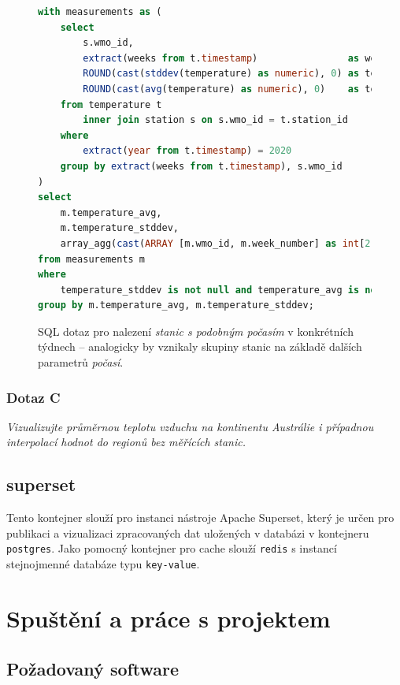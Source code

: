 \documentclass[10pt,a4paper,titlepage]{extarticle}
\begin{document}
\begin{figure}[H]
    \begin{lstlisting}[language=SQL]
with measurements as (
    select
        s.wmo_id,
        extract(weeks from t.timestamp)                as week_number,
        ROUND(cast(stddev(temperature) as numeric), 0) as temperature_stddev,
        ROUND(cast(avg(temperature) as numeric), 0)    as temperature_avg
    from temperature t
        inner join station s on s.wmo_id = t.station_id
    where
        extract(year from t.timestamp) = 2020
    group by extract(weeks from t.timestamp), s.wmo_id
)
select
    m.temperature_avg,
    m.temperature_stddev,
    array_agg(cast(ARRAY [m.wmo_id, m.week_number] as int[2])) as stations_in_time
from measurements m
where
    temperature_stddev is not null and temperature_avg is not null
group by m.temperature_avg, m.temperature_stddev;
    \end{lstlisting}
    \caption{SQL dotaz pro nalezení \emph{stanic s podobným počasím} v konkrétních týdnech -- analogicky by vznikaly
    skupiny stanic na základě dalších parametrů \emph{počasí}.}
    \label{lst:sql-dotaz-b}
\end{figure}

    \subsubsection{Dotaz C}

    \emph{Vizualizujte průměrnou teplotu vzduchu na kontinentu Austrálie i případnou interpolací hodnot do regionů
    bez měřících stanic.}

    \subsection{superset}

    Tento kontejner slouží pro instanci nástroje Apache Superset, který je určen pro publikaci a vizualizaci
    zpracovaných dat uložených v databázi v kontejneru \texttt{postgres}. Jako pomocný kontejner pro cache slouží
    \texttt{redis} s instancí stejnojmenné databáze typu \texttt{key-value}.

    \section{Spuštění a práce s projektem}

    \subsection{Požadovaný software}\label{requirements}
\end{document}
